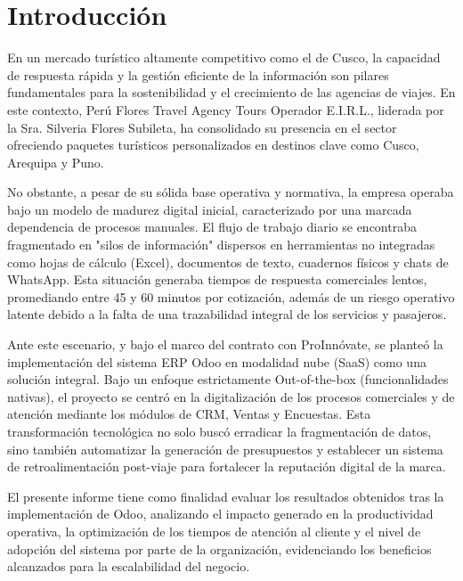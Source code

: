 \section{Introducción}

En un mercado turístico altamente competitivo como el de Cusco, la capacidad de respuesta rápida y la gestión eficiente de la información son pilares fundamentales para la sostenibilidad y el crecimiento de las agencias de viajes. En este contexto, Perú Flores Travel Agency Tours Operador E.I.R.L., liderada por la Sra. Silveria Flores Subileta, ha consolidado su presencia en el sector ofreciendo paquetes turísticos personalizados en destinos clave como Cusco, Arequipa y Puno.

No obstante, a pesar de su sólida base operativa y normativa, la empresa operaba bajo un modelo de madurez digital inicial, caracterizado por una marcada dependencia de procesos manuales. El flujo de trabajo diario se encontraba fragmentado en "silos de información" dispersos en herramientas no integradas como hojas de cálculo (Excel), documentos de texto, cuadernos físicos y chats de WhatsApp. Esta situación generaba tiempos de respuesta comerciales lentos, promediando entre 45 y 60 minutos por cotización, además de un riesgo operativo latente debido a la falta de una trazabilidad integral de los servicios y pasajeros.

Ante este escenario, y bajo el marco del contrato con ProInnóvate, se planteó la implementación del sistema ERP Odoo en modalidad nube (SaaS) como una solución integral. Bajo un enfoque estrictamente Out-of-the-box (funcionalidades nativas), el proyecto se centró en la digitalización de los procesos comerciales y de atención mediante los módulos de CRM, Ventas y Encuestas. Esta transformación tecnológica no solo buscó erradicar la fragmentación de datos, sino también automatizar la generación de presupuestos y establecer un sistema de retroalimentación post-viaje para fortalecer la reputación digital de la marca.

El presente informe tiene como finalidad evaluar los resultados obtenidos tras la implementación de Odoo, analizando el impacto generado en la productividad operativa, la optimización de los tiempos de atención al cliente y el nivel de adopción del sistema por parte de la organización, evidenciando los beneficios alcanzados para la escalabilidad del negocio.
